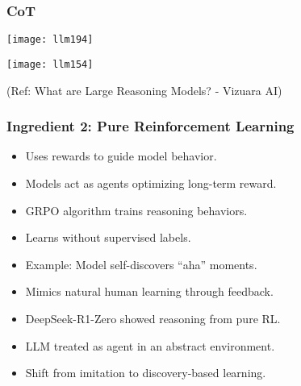 \begin{frame}[fragile]\frametitle{CoT}


		\begin{center}
		\texttt{[image: llm194]}
		\end{center}


		\begin{center}
		\texttt{[image: llm154]}		
		\end{center}  
  


{\tiny (Ref: What are Large Reasoning Models? - Vizuara AI)}

\end{frame}


\begin{frame}[fragile]\frametitle{Ingredient 2: Pure Reinforcement Learning}
\begin{itemize}
  \item Uses rewards to guide model behavior.
  \item Models act as agents optimizing long-term reward.
  \item GRPO algorithm trains reasoning behaviors.
  \item Learns without supervised labels.
  \item Example: Model self-discovers ``aha'' moments.
  \item Mimics natural human learning through feedback.
  \item DeepSeek-R1-Zero showed reasoning from pure RL.
  \item LLM treated as agent in an abstract environment.
  \item Shift from imitation to discovery-based learning.
\end{itemize}
\end{frame}

